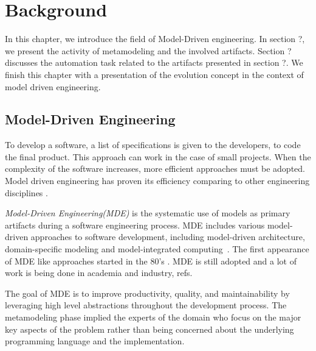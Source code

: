 \clearemptydoublepage
\chapter{Background}

In this chapter, we introduce the field of Model-Driven engineering. In section ?, we present the activity of metamodeling and the involved artifacts. Section ? discusses the automation task related to the artifacts presented in section ?. We finish this chapter with a presentation of the evolution concept in the context of model driven engineering.

\section{Model-Driven Engineering}
To develop a software, a list of specifications is given to the developers, to code the final product. This approach can work in the case of small projects. When the complexity of the software increases, more efficient approaches must be adopted. Model driven engineering has proven  its efficiency comparing to other engineering disciplines \cite{1231146}.

\textit{Model-Driven Engineering(MDE)} is the systematic use of models as primary artifacts during a software engineering process. MDE includes various model-driven approaches to software development, including model-driven architecture, domain-specific modeling and model-integrated computing~\cite{10.1145/1985793.1985882}. The first appearance of MDE like approaches started in the 80's \cite{10.1007/s10270-005-0079-0}. MDE is still adopted  and a lot of work is being done in academia and industry, refs.


The goal of MDE is to improve productivity, quality, and maintainability by leveraging high level abstractions throughout the development process. The metamodeling phase implied the experts of the domain who focus on the major key aspects of the problem rather than being concerned about the underlying programming language and the implementation.

